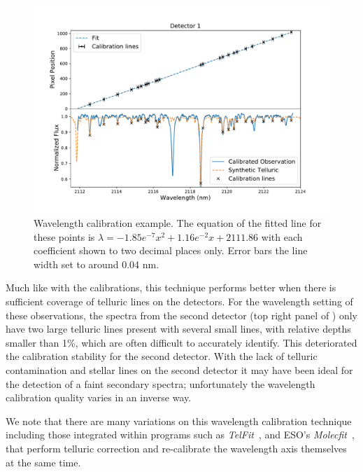 
\begin{figure}
    \centering
    \includegraphics[width=0.8\linewidth]{figures/reduction/calibration.pdf}
    \caption{Wavelength calibration example.
    The equation of the fitted line for these points is $\lambda = -1.85e^{-7} x^2 + 1.16e^{-2} x + 2111.86$ with each coefficient shown to two decimal places only. Error bars the line width set to around 0.04 nm.}
    \label{fig:wl_calibration}
\end{figure}

Much like with the \thar{} calibrations, this technique performs better when there is sufficient coverage of telluric lines on the detectors. For the wavelength setting of these observations, the spectra from the second detector (top right panel of ) only have two large telluric lines present with several small lines, with relative depths smaller than 1\%, which are often difficult to accurately identify. This deteriorated the calibration stability for the second detector. With the lack of telluric contamination and stellar lines on the second detector it may have been ideal for the detection of a faint secondary spectra; unfortunately the wavelength calibration quality varies in an inverse way.


We note that there are many variations on this wavelength calibration technique including those integrated within programs such as \emph{TelFit}~\citet{gullikson_correcting_2014}, and {ESO}'s \emph{Molecfit}~\citet{smette_molecfit_2015}, that perform telluric correction and re-calibrate the wavelength axis themselves at the same time.


